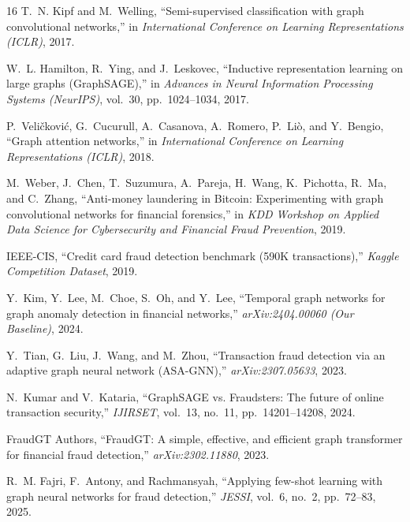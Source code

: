 \documentclass[11pt, a4paper]{article}
\begin{document}
\vspace{0.2cm}
\begin{thebibliography}{16}
T.~N. Kipf and M.~Welling, ``Semi-supervised classification with graph convolutional networks,'' in \emph{International Conference on Learning Representations (ICLR)}, 2017.

W.~L. Hamilton, R.~Ying, and J.~Leskovec, ``Inductive representation learning on large graphs (GraphSAGE),'' in \emph{Advances in Neural Information Processing Systems (NeurIPS)}, vol.~30, pp.~1024--1034, 2017.

P.~Veli{\v{c}}kovi{\'{c}}, G.~Cucurull, A.~Casanova, A.~Romero, P.~Li{\`{o}}, and Y.~Bengio, ``Graph attention networks,'' in \emph{International Conference on Learning Representations (ICLR)}, 2018.

M.~Weber, J.~Chen, T.~Suzumura, A.~Pareja, H.~Wang, K.~Pichotta, R.~Ma, and C.~Zhang, ``Anti-money laundering in {Bitcoin}: Experimenting with graph convolutional networks for financial forensics,'' in \emph{KDD Workshop on Applied Data Science for Cybersecurity and Financial Fraud Prevention}, 2019.

{IEEE-CIS}, ``Credit card fraud detection benchmark (590K transactions),'' \emph{Kaggle Competition Dataset}, 2019.

Y.~Kim, Y.~Lee, M.~Choe, S.~Oh, and Y.~Lee, ``Temporal graph networks for graph anomaly detection in financial networks,'' \emph{arXiv:2404.00060 (Our Baseline)}, 2024.

Y.~Tian, G.~Liu, J.~Wang, and M.~Zhou, ``Transaction fraud detection via an adaptive graph neural network (ASA-GNN),'' \emph{arXiv:2307.05633}, 2023.

N.~Kumar and V.~Kataria, ``GraphSAGE vs. Fraudsters: The future of online transaction security,'' \emph{IJIRSET}, vol.~13, no.~11, pp.~14201--14208, 2024.

{FraudGT Authors}, ``FraudGT: A simple, effective, and efficient graph transformer for financial fraud detection,'' \emph{arXiv:2302.11880}, 2023.

R.~M. Fajri, F.~Antony, and Rachmansyah, ``Applying few-shot learning with graph neural networks for fraud detection,'' \emph{JESSI}, vol.~6, no.~2, pp.~72--83, 2025.


\end{thebibliography}
\end{document}
